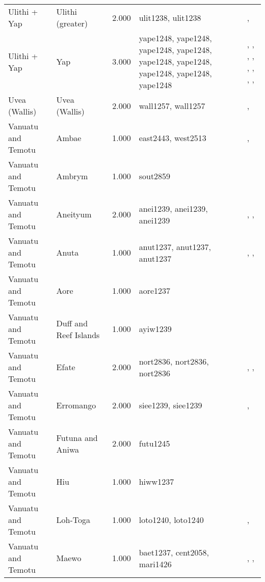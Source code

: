\begin{longtable}{p{1.8cm}p{1.8cm}p{1.8cm}p{2cm}p{7cm}}
  Ulithi + Yap & Ulithi (greater) & 2.000 & ulit1238, ulit1238 & \citet{lessa1950}, \citet{lessa1966} \\ 
  Ulithi + Yap & Yap & 3.000 & yape1248, yape1248, yape1248, yape1248, yape1248, yape1248, yape1248, yape1248, yape1248 & \citet{huntetal1949}, \citet{muller1917}, \citet{murdocketal1944b}, \citet{salesius1906}, \citet{schneider1953}, \citet{schneider1957_yap}, \citet{schneider1962}, \citet{tetens_savages}, \citet{tetensandkubary1873} \\ 
  Uvea (Wallis) & Uvea (Wallis) & 2.000 & wall1257, wall1257 & \citet{burrows1937}, \citet{pollock1995power} \\ 
  Vanuatu and Temotu & Ambae & 1.000 & east2443, west2513 & \citet{bonnemaison1972systeme}, \citet{bonnemaison1972systeme} \\ 
  Vanuatu and Temotu & Ambrym & 1.000 & sout2859 & \citet{tonkinson1981church} \\ 
  Vanuatu and Temotu & Aneityum & 2.000 & anei1239, anei1239, anei1239 & \citet{humphreys1926}, \citet{spriggs1982taro}, \citet{spriggs1986landscape} \\ 
  Vanuatu and Temotu & Anuta & 1.000 & anut1237, anut1237, anut1237 & \citet{feinberg1988socio}, \citet{feinberg1991}, \citet{kirch2002te} \\ 
  Vanuatu and Temotu & Aore & 1.000 & aore1237 & \citet{bonnemaison1996power} \\ 
  Vanuatu and Temotu & Duff and Reef Islands & 1.000 & ayiw1239 & \citet{davenport1969} \\ 
  Vanuatu and Temotu & Efate & 2.000 & nort2836, nort2836, nort2836 & \citet{facey1981hereditary}, \citet{facey1981hereditary}, \citet{facey1981hereditary} \\ 
  Vanuatu and Temotu & Erromango & 2.000 & siee1239, siee1239 & \citet{humphreys1926}, \citet{spriggs1989archaeological} \\ 
  Vanuatu and Temotu & Futuna and Aniwa & 2.000 & futu1245 & \citet{capell1958culture} \\ 
  Vanuatu and Temotu & Hiu & 1.000 & hiww1237 & \citet{bonnemaison1996power} \\ 
  Vanuatu and Temotu & Loh-Toga & 1.000 & loto1240, loto1240 & \citet{bonnemaison1996power}, \citet{bonnemaison1996power} \\ 
  Vanuatu and Temotu & Maewo & 1.000 & baet1237, cent2058, mari1426 & \citet{bonnemaison1996power}, \citet{bonnemaison1996power}, \citet{bonnemaison1996power} \\ 

\end{longtable}
